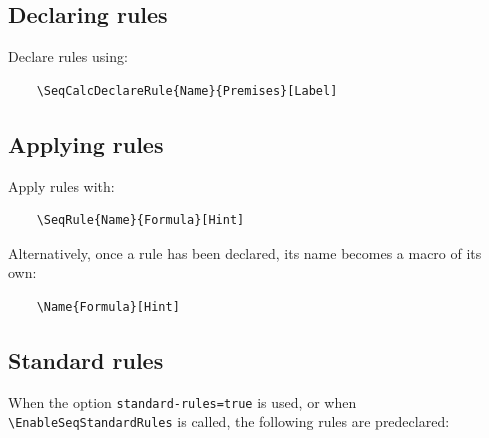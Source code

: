 \documentclass[a4paper,1pt]{article}
\begin{document}
\subsection{Declaring rules}
Declare rules using:
\begin{lstlisting}
    \SeqCalcDeclareRule{Name}{Premises}[Label]
\end{lstlisting}

\subsection{Applying rules}
Apply rules with:
\begin{lstlisting}
    \SeqRule{Name}{Formula}[Hint]
\end{lstlisting}
Alternatively, once a rule has been declared, its name becomes a macro of its own:
\begin{lstlisting}
    \Name{Formula}[Hint]
\end{lstlisting}

\subsection{Standard rules}
\label{subsec:standard-rules}

When the option \texttt{standard-rules=true} is used, or when \texttt{\textbackslash EnableSeqStandardRules} is called, the following
rules are predeclared:
\end{document}
